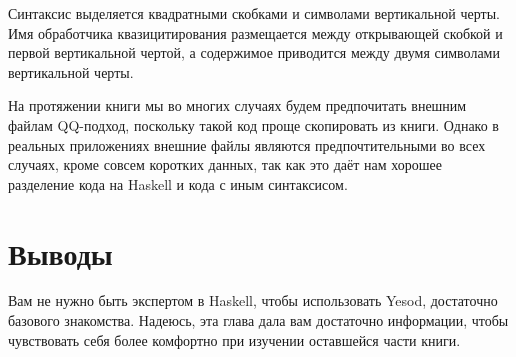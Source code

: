 Синтаксис выделяется квадратными скобками и символами вертикальной черты. Имя обработчика квазицитирования размещается между открывающей скобкой и первой вертикальной чертой, а содержимое приводится между двумя символами вертикальной черты.

На протяжении книги мы во многих случаях будем предпочитать внешним файлам QQ-подход, поскольку такой код проще скопировать из книги. Однако в реальных приложениях внешние файлы являются предпочтительными во всех случаях, кроме совсем коротких данных, так как это даёт нам хорошее разделение кода на Haskell и кода с иным синтаксисом.

\section{Выводы}

Вам не нужно быть экспертом в Haskell, чтобы использовать Yesod, достаточно базового знакомства. Надеюсь, эта глава дала вам достаточно информации, чтобы чувствовать себя более комфортно при изучении оставшейся части книги.
